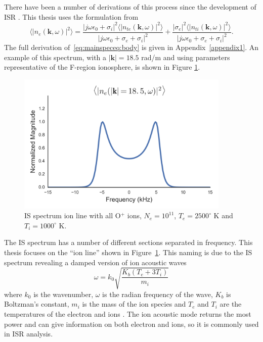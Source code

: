There have been a number of derivations of this process since the development of ISR \cite{dougherty:farley1960,farleydougherty:ISR2,doughteryfarley:ISR3,hagfors1961}. This thesis uses the formulation from~\cite{kudeki:milla:1,kudeki:milla:2,Kudeki:2006kx}
\begin{equation}
\label{eq:mainspeceq:body}
\langle \left|n_e(\mathbf{k},\omega)\right|^2\rangle = \frac{|j\omega\epsilon_0 + \sigma_i|^2 \langle |n_{te}(\mathbf{k},\omega)|^2\rangle}{|j\omega\epsilon_0 +\sigma_e+\sigma_i|^2} + \frac{| \sigma_e|^2 \langle |n_{ti}(\mathbf{k},\omega)|^2\rangle}{|j\omega\epsilon_0 +\sigma_e+\sigma_i|^2}.
\end{equation}
The full derivation of~\eqref{eq:mainspeceq:body} is given in Appendix~\ref{appendix1}.
An example of this spectrum, with a $|\mathbf{k}|=18.5$ rad/m and using parameters representative of the F-region ionosphere, is shown in Figure \ref{fig:ispecch2}. 
\begin{figure}[!t]
\centering
\includegraphics[width=4in]{Specion}
\caption{IS spectrum ion line with all O$^+$ ions, $N_e = 10^{11}$, $T_e=2500 ^\circ$ K and $T_i=1000 ^\circ$ K. }
\label{fig:ispecch2}
\end{figure}
The IS spectrum has a number of different sections separated in frequency.
This thesis focuses on the ``ion line'' shown in Figure~\ref{fig:ispecch2}. This naming is due to the IS spectrum revealing a damped version of ion acoustic waves
\begin{equation} 
\label{eqn:ial}
\omega=k_0\sqrt{\frac{K_b(T_e+3T_i)}{m_i}}
\end{equation}
where $k_0$ is the wavenumber, $\omega$ is the radian frequency of the wave, $K_b$ is Boltzman's constant, $m_i$ is the mass of the ion species and $T_e$ and $T_i$ are the temperatures of the electron and ions \cite{chen1984introduction}. 
The ion acoustic mode returns the most power and can give information on both electron and ions, so it is commonly used in ISR analysis.

